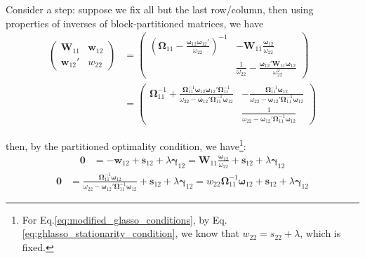 \documentclass[twoside]{article}
\begin{document}
Consider a  step: suppose we fix all but the last row/column, then using properties of inverses of block-partitioned matrices, we have 
\begin{align*}
    \begin{pmatrix}
        \mathbf{W}_{11} & \mathbf{w}_{12}\\
        \mathbf{w}_{12}' & w_{22}
     \end{pmatrix} &= \begin{pmatrix}
        \left( \boldsymbol{\Omega}_{11}-\frac{\boldsymbol{\omega}_{12}\boldsymbol{\omega}_{12}'}{\omega_{22}} \right)^{-1} & -\mathbf{W}_{11}\frac{\boldsymbol{\omega}_{12}}{\omega_{22}}\\
         & \frac{1}{\omega_{22}}-\frac{\boldsymbol{\omega}_{12}'\mathbf{W}_{11}\boldsymbol{\omega}_{12}}{\omega^2_{22}}
     \end{pmatrix}\\
     &= \begin{pmatrix}
        \boldsymbol{\Omega}^{-1}_{11}+\frac{\boldsymbol{\Omega}^{-1}_{11}\boldsymbol{\omega}_{12}\boldsymbol{\omega}_{12}'\boldsymbol{\Omega}^{-1}_{11}}{\omega_{22}-\boldsymbol{\omega}_{12}'\boldsymbol{\Omega}^{-1}_{11}\boldsymbol{\omega}_{12}} & -\frac{\boldsymbol{\Omega}^{-1}_{11}\boldsymbol{\omega}_{12}}{\omega_{22}-\boldsymbol{\omega}_{12}'\boldsymbol{\Omega}^{-1}_{11}\boldsymbol{\omega}_{12}} \\
        & \frac{1}{\omega_{22}-\boldsymbol{\omega}_{12}'\boldsymbol{\Omega}^{-1}_{11}\boldsymbol{\omega}_{12}}
     \end{pmatrix}
\end{align*}

then, by the partitioned optimality condition, we have\footnote{For Eq.\ref{eq:modified_glasso_conditions}, by Eq.\ref{eq:ghlasso_stationarity_condition}, we know that $w_{22}=s_{22}+\lambda$, which is fixed.}:
\begin{align}\label{eq:glasso_conditions}
    \mathbf{0} &= -\mathbf{w}_{12} + \mathbf{s}_{12}+\lambda \boldsymbol{\gamma}_{12} = \mathbf{W}_{11}\frac{\boldsymbol{\omega}_{12}}{\omega_{22}}+ \mathbf{s}_{12}+\lambda \boldsymbol{\gamma}_{12}
\end{align}
\begin{align}\label{eq:modified_glasso_conditions}
    \mathbf{0} &= \frac{\boldsymbol{\Omega}^{-1}_{11}\boldsymbol{\omega}_{12}}{\omega_{22}-\boldsymbol{\omega}_{12}'\boldsymbol{\Omega}^{-1}_{11}\boldsymbol{\omega}_{12}} + \mathbf{s}_{12} + \lambda\boldsymbol{\gamma}_{12} = w_{22}\boldsymbol{\Omega}^{-1}_{11}\boldsymbol{\omega}_{12} + \mathbf{s}_{12} + \lambda\boldsymbol{\gamma}_{12}
\end{align}
\end{document}
